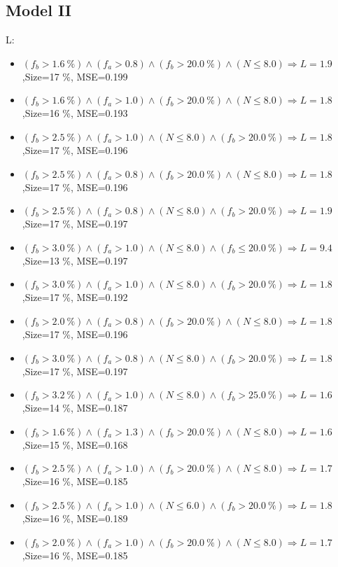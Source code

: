 \documentclass[numbered]{CSL}
\begin{document}
\subsection{Model II}
L:
\begin{itemize}
\item $(f_b > 1.6~\%) \land (f_a > 0.8) \land (f_b > 20.0~\%) \land (N \leq 8.0) \Rightarrow L = 1.9$,\hfill Size=17 \%, MSE=0.199
\item $(f_b > 1.6~\%) \land (f_a > 1.0) \land (f_b > 20.0~\%) \land (N \leq 8.0) \Rightarrow L = 1.8$,\hfill Size=16 \%, MSE=0.193
\item $(f_b > 2.5~\%) \land (f_a > 1.0) \land (N \leq 8.0) \land (f_b > 20.0~\%) \Rightarrow L = 1.8$,\hfill Size=17 \%, MSE=0.196
\item $(f_b > 2.5~\%) \land (f_a > 0.8) \land (f_b > 20.0~\%) \land (N \leq 8.0) \Rightarrow L = 1.8$,\hfill Size=17 \%, MSE=0.196
\item $(f_b > 2.5~\%) \land (f_a > 0.8) \land (N \leq 8.0) \land (f_b > 20.0~\%) \Rightarrow L = 1.9$,\hfill Size=17 \%, MSE=0.197
\item $(f_b > 3.0~\%) \land (f_a > 1.0) \land (N \leq 8.0) \land (f_b \leq 20.0~\%) \Rightarrow L = 9.4$,\hfill Size=13 \%, MSE=0.197
\item $(f_b > 3.0~\%) \land (f_a > 1.0) \land (N \leq 8.0) \land (f_b > 20.0~\%) \Rightarrow L = 1.8$,\hfill Size=17 \%, MSE=0.192
\item $(f_b > 2.0~\%) \land (f_a > 0.8) \land (f_b > 20.0~\%) \land (N \leq 8.0) \Rightarrow L = 1.8$,\hfill Size=17 \%, MSE=0.196
\item $(f_b > 3.0~\%) \land (f_a > 0.8) \land (N \leq 8.0) \land (f_b > 20.0~\%) \Rightarrow L = 1.8$,\hfill Size=17 \%, MSE=0.197
\item $(f_b > 3.2~\%) \land (f_a > 1.0) \land (N \leq 8.0) \land (f_b > 25.0~\%) \Rightarrow L = 1.6$,\hfill Size=14 \%, MSE=0.187
\item $(f_b > 1.6~\%) \land (f_a > 1.3) \land (f_b > 20.0~\%) \land (N \leq 8.0) \Rightarrow L = 1.6$,\hfill Size=15 \%, MSE=0.168
\item $(f_b > 2.5~\%) \land (f_a > 1.0) \land (f_b > 20.0~\%) \land (N \leq 8.0) \Rightarrow L = 1.7$,\hfill Size=16 \%, MSE=0.185
\item $(f_b > 2.5~\%) \land (f_a > 1.0) \land (N \leq 6.0) \land (f_b > 20.0~\%) \Rightarrow L = 1.8$,\hfill Size=16 \%, MSE=0.189
\item $(f_b > 2.0~\%) \land (f_a > 1.0) \land (f_b > 20.0~\%) \land (N \leq 8.0) \Rightarrow L = 1.7$,\hfill Size=16 \%, MSE=0.185

\end{itemize}
\end{document}
